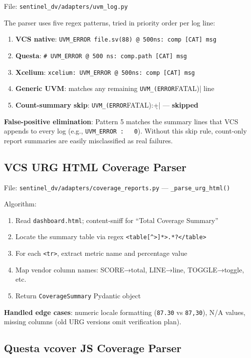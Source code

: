 \documentclass[11pt,a4paper]{article}
\begin{document}
File: \texttt{sentinel\_dv/adapters/uvm\_log.py}

The parser uses five regex patterns, tried in priority order per log line:

\begin{enumerate}
  \item \textbf{VCS native}: \verb|UVM_ERROR file.sv(88) @ 500ns: comp [CAT] msg|
  \item \textbf{Questa}: \verb|# UVM_ERROR @ 500 ns: comp.path [CAT] msg|
  \item \textbf{Xcelium}: \verb|xcelium: UVM_ERROR @ 500ns: comp [CAT] msg|
  \item \textbf{Generic UVM}: matches any remaining \verb|UVM_(ERROR|FATAL)| line
  \item \textbf{Count-summary skip}: \verb|UVM_(ERROR|FATAL)\s*:\s*\d+| — \textbf{skipped}
\end{enumerate}

\textbf{False-positive elimination}: Pattern 5 matches the summary lines that VCS
appends to every log (e.g., \texttt{UVM\_ERROR :\ \ \ 0}). Without this skip rule,
count-only report summaries are easily misclassified as real failures.

\subsection{VCS URG HTML Coverage Parser}

File: \texttt{sentinel\_dv/adapters/coverage\_reports.py} — \texttt{\_parse\_urg\_html()}

Algorithm:
\begin{enumerate}
  \item Read \texttt{dashboard.html}; content-sniff for ``Total Coverage Summary''
  \item Locate the summary table via regex \verb|<table[^>]*>.*?</table>|
  \item For each \verb|<tr>|, extract metric name and percentage value
  \item Map vendor column names: SCORE→total, LINE→line, TOGGLE→toggle, etc.
  \item Return \texttt{CoverageSummary} Pydantic object
\end{enumerate}

\textbf{Handled edge cases}: numeric locale formatting (\texttt{87.30} vs
\texttt{87,30}), N/A values, missing columns (old URG versions omit verification
plan).

\subsection{Questa vcover JS Coverage Parser}
\end{document}
